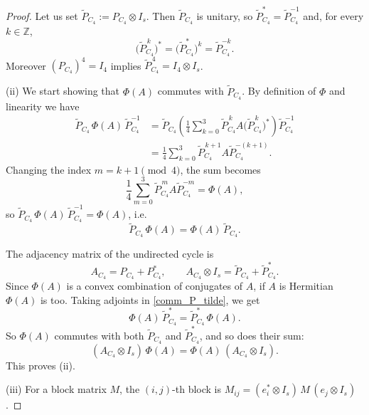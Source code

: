 \documentclass[10pt,a4paper]{amsart}
\newcommand{\Z}{\mathbb{Z}}
\begin{document}
\begin{proof}
Let us set \(\widetilde P_{C_4} := P_{C_4}\otimes I_s\).  
Then \(\widetilde P_{C_4}\) is unitary, so \(\widetilde P^*_{C_4}=\widetilde P^{-1}_{C_4}\) and,
for every \(k \in \Z\),
\[
\bigl(\widetilde P_{C_4}^{\,k}\bigr)^*
= \bigl(\widetilde P_{C_4}^*\bigr)^{k}
= \widetilde P_{C_4}^{-k}.
\]
Moreover \((P_{C_4})^4 = I_4\) implies \(\widetilde P_{C_4}^{\,4} = I_4\otimes I_s\).


\smallskip

(ii) 
We start showing that \(\Phi(A)\) commutes with \(\widetilde P_{C_4}\).
By definition of \(\Phi\) and linearity we have
\begin{align*}
\widetilde P_{C_4}\,\Phi(A)\,\widetilde P_{C_4}^{-1}
&= \widetilde P_{C_4} \left( \frac{1}{4}\sum_{k=0}^{3} 
\widetilde P_{C_4}^{\,k} A \bigl(\widetilde P_{C_4}^{\,k}\bigr)^{*} \right) \widetilde P_{C_4}^{-1} \\
&= \frac14 \sum_{k=0}^3 
\widetilde P_{C_4}^{\,k+1} A \widetilde P_{C_4}^{-(k+1)}.
\end{align*}
Changing the index \(m=k+1 \pmod 4\), the sum becomes
\[
\frac14 \sum_{m=0}^3 \widetilde P_{C_4}^{\,m} A \widetilde P_{C_4}^{-m} = \Phi(A),
\]
so \(\widetilde P_{C_4}\,\Phi(A)\,\widetilde P_{C_4}^{-1}=\Phi(A)\), i.e. 
\begin{equation}\label{comm_P_tilde}
    \widetilde P_{C_4}\,\Phi(A)=\Phi(A)\,\widetilde P_{C_4}.
\end{equation}

The adjacency matrix of the undirected cycle is
\[
A_{C_4} = P_{C_4} + P_{C_4}^*,
\qquad
A_{C_4}\otimes I_s
= \widetilde P_{C_4} + \widetilde P_{C_4}^{*}.
\]
Since \(\Phi(A)\) is a convex combination of conjugates of \(A\), if \(A\) is Hermitian \(\Phi(A)\) is too. Taking adjoints in \eqref{comm_P_tilde}, we get
\[
\Phi(A)\,\widetilde P_{C_4}^{*} = \widetilde P_{C_4}^{*} \,\Phi(A).
\]
So \(\Phi(A)\) commutes with both \(\widetilde P_{C_4}\) and \(\widetilde P_{C_4}^{*}\), and so does their sum:
\[
(A_{C_4}\otimes I_s)\,\Phi(A)
= \Phi(A)\,(A_{C_4}\otimes I_s).
\]
This proves (ii).

\smallskip

(iii)
For a block matrix \(M\), the \((i,j)\)-th block is
\(M_{ij}=(e_i^*\otimes I_s)\,M\,(e_j\otimes I_s)\).


\end{proof}
\end{document}
